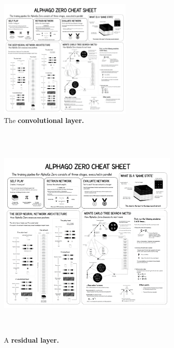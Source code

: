 \documentclass{article}
\begin{document}
\begin{enumerate}
\end{enumerate}

\begin{figure}[H]
	\begin{subfigure}{.5\textwidth}
		\centering
		\includegraphics[height=6cm,trim={393px 313px 6855px 6134px},clip]{alpha_go_zero_cheat_sheet.png}
		\caption{The \textbf{convolutional layer.}}
		\label{fig:arch_convolution}
	\end{subfigure}
	\hfill
	\begin{subfigure}{.5\textwidth}
		\centering
		\includegraphics[height=11cm,trim={2518px 305px 4672px 4775px},clip]{alpha_go_zero_cheat_sheet.png}
		\caption{A \textbf{residual layer.}}
		\label{fig:arch_residual}
	\end{subfigure}
	\newline
	\begin{subfigure}{0.5\textwidth}
		\centering

\end{subfigure}
\end{figure}
\end{document}
